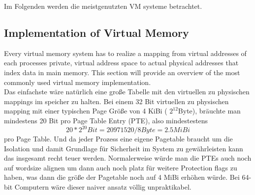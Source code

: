 Im Folgenden werden die meistgenutzten VM systeme betrachtet.


\subsection{Implementation of Virtual Memory}
Every virtual memory system has to realize a mapping from virtual addresses of each processes
private, virtual address space to actual physical addresses that index data in main memory.
This section will provide an overview of the most commonly used virtual memory implementation.\\

Das einfachste wäre natürlich eine große Tabelle mit den virtuellen zu physischen mappings im
speicher zu halten. Bei einem 32 Bit virtuellen zu physischen mapping mit einer typischen Page Größe
von 4 KiBi ( $ 2^{12}$Byte), bräuchte man mindestens 20 Bit pro Page Table Entry (PTE), also mindestestens
\[ 20 * 2^{20} Bit = 20971520 / 8 Byte = 2.5 MiBi \]
pro Page Table. Und da jeder Prozess eine eigene Pagetable braucht um die Isolation und damit Grundlage
für Sicherheit im System zu gewährleisten kann das insgesamt recht teuer werden.
Normalerweise würde man die PTEs auch noch auf wordsize alignen um dann auch noch platz für weitere
Protection flags zu haben, was dann die größe der Pagetable noch auf 4 MiBi erhöhen würde.
Bei 64-bit Computern wäre dieser naiver ansatz völlig unpraktikabel.
\\
